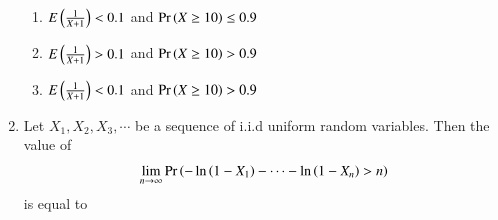 \begin{enumerate}[label=\thesection.\arabic*.,ref=\thesection.\theenumi]
\begin{enumerate}
  \item   $E\left(\frac{1}{X+1}\right) < 0.1$ and $\Pr\left(X \ge 10\right) \le 0.9$
  \item   $E\left(\frac{1}{X+1}\right) > 0.1$ and $\Pr\left(X \ge 10\right) > 0.9$
  \item   $E\left(\frac{1}{X+1}\right) < 0.1$ and $\Pr\left(X \ge 10\right) > 0.9$
  \end{enumerate}
  \solution
    
%
\item Let $X_{1},X_{2},X_{3},\cdots$ be a sequence of i.i.d uniform  random variables. Then the value of 
\begin{align} \lim_{n\to\infty} \Pr\left(-\ln{\ensuremath{\left(1-X_{1}\right)}}-\cdots-\ln{\ensuremath{\left(1-X_{n}\right)}} > n\right) 
\end{align} is equal to 
%
%
\\
\solution
  


\end{enumerate}